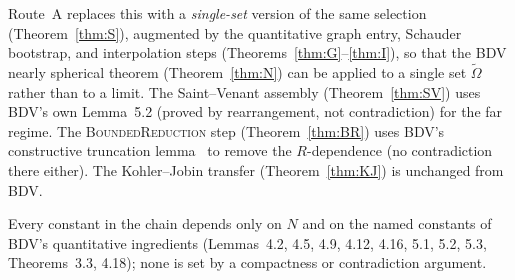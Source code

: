 \documentclass[11pt]{article}
\theoremstyle{definition}
\newcommand{\Om}{\Omega}
\begin{document}
Route~A replaces this with a \emph{single-set} version of the same
selection (Theorem~\ref{thm:S}), augmented by the quantitative graph
entry, Schauder bootstrap, and interpolation steps
(Theorems~\ref{thm:G}--\ref{thm:I}), so that the BDV nearly spherical
theorem (Theorem~\ref{thm:N}) can be applied to a single set
$\widetilde\Om$ rather than to a limit. The Saint--Venant assembly
(Theorem~\ref{thm:SV}) uses BDV's own Lemma~5.2 (proved by
rearrangement, not contradiction) for the far regime. The
\textsc{BoundedReduction} step (Theorem~\ref{thm:BR}) uses BDV's
constructive truncation lemma~\cite[Lemma~5.3]{BDV} to remove the
$R$-dependence (no contradiction there either). The Kohler--Jobin
transfer (Theorem~\ref{thm:KJ}) is unchanged from BDV.

Every constant in the chain depends only on $N$ and on the named
constants of BDV's quantitative ingredients (Lemmas~4.2, 4.5, 4.9,
4.12, 4.16, 5.1, 5.2, 5.3, Theorems~3.3, 4.18); none is set by a
compactness or contradiction argument.
\end{document}
